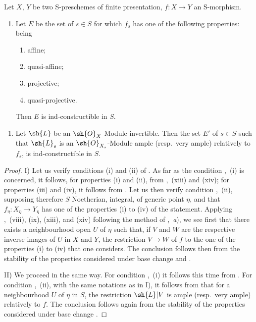 \begin{proposition}[9.6.2]
\label{IV.9.6.2}
Let $X$, $Y$ be two S-preschemes of finite presentation, $f:X\to Y$ an S-morphism.
\begin{enumerate}[label=\upshape{I)}]
  \item Let $E$ be the set of $s\in S$ for which $f_s$ has one of the following properties: being
  \begin{enumerate}[label=(\roman*)]
    \item affine;
    \item quasi-affine;
    \item projective;
    \item quasi-projective.
  \end{enumerate}
  Then $E$ is ind-constructible in $S$.
\end{enumerate}


\begin{enumerate}[label=\upshape{II)}]
  \item Let $\sh{L}$ be an $\sh{O}_X$-Module invertible.
  Then the set $E'$ of $s\in S$ such that $\sh{L}_s$ is an $\sh{O}_{X_s}$-Module ample (resp.\ very ample) relatively to $f_s$, is ind-constructible in $S$.
\end{enumerate}
\end{proposition}

\begin{proof}
I) Let us verify conditions (i) and (ii) of .
As far as the condition ,~(i) is concerned, it follows, for properties (i) and (ii), from ,~(xiii) and (xiv); for properties (iii) and (iv), it follows from .
Let us then verify condition ,~(ii), supposing therefore $S$ Noetherian, integral, of generic point $\eta$, and that $f_\eta:X_\eta\to Y_\eta$ has one of the properties (i) to (iv) of the statement.
Applying ,~(viii), (ix), (xiii), and (xiv) following the method of ,~\emph{a}), we see first that there exists a neighbourhood open $U$ of $\eta$ such that, if $V$ and $W$ are the respective inverse images of $U$ in $X$ and $Y$, the restriction $V\to W$ of $f$ to the one of the properties (i) to (iv) that one considers.
The conclusion follows then from the stability of the properties considered under base change  and .

II) We proceed in the same way.
For condition ,~(i) it follows this time from .
For condition ,~(ii), with the same notations as in I), it follows from  that for a neighbourhood $U$ of $\eta$ in $S$, the restriction $\sh{L}|V$ is ample (resp.\ very ample) relatively to $f$.
The conclusion follows again from the stability of the properties considered under base change .
\end{proof}

